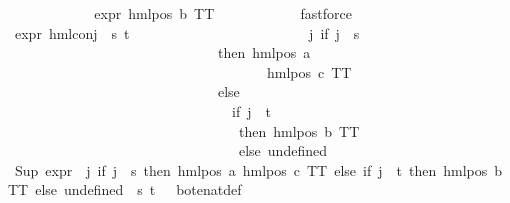 \begin{isabellebody}
\ \ \ \ \isamarkupfalse%
{\isacharminus}{\kern0pt}\isanewline
\ \ \ \ \ \ \isamarkupfalse%
\ {\isachardoublequoteopen}expr{\isacharunderscore}{\kern0pt}{}\ {\isacharparenleft}{\kern0pt}hml{\isacharunderscore}{\kern0pt}pos\ b\ TT{\isacharparenright}{\kern0pt}\ {\isacharequal}{\kern0pt}\ {}{\isachardoublequoteclose}\isanewline
\ \ \ \ \ \ \ \ \isamarkupfalse%
\ fastforce\isanewline
\ \ \ \ \ \ \isamarkupfalse%
\ {\isachardoublequoteopen}expr{\isacharunderscore}{\kern0pt}{}\ {\isacharparenleft}{\kern0pt}hml{\isacharunderscore}{\kern0pt}conj\ {\isacharbraceleft}{\kern0pt}{\isacharbraceright}{\kern0pt}\ {\isacharbraceleft}{\kern0pt}s{\isacharcomma}{\kern0pt}\ t{\isacharbraceright}{\kern0pt}\ \isanewline
\ \ \ \ \ \ \ \ \ \ \ \ \ \ \ \ \ \ \ \ \ \ \ \ {\isacharparenleft}{\kern0pt}{\isasymlambda}j{\isachardot}{\kern0pt}\ {\isacharparenleft}{\kern0pt}if\ j\ {\isacharequal}{\kern0pt}\ s\ \isanewline
\ \ \ \ \ \ \ \ \ \ \ \ \ \ \ \ \ \ \ \ \ \ \ \ \ \ \ \ \ \ then\ {\isacharparenleft}{\kern0pt}hml{\isacharunderscore}{\kern0pt}pos\ a\ \isanewline
\ \ \ \ \ \ \ \ \ \ \ \ \ \ \ \ \ \ \ \ \ \ \ \ \ \ \ \ \ \ \ \ \ \ \ \ \ {\isacharparenleft}{\kern0pt}hml{\isacharunderscore}{\kern0pt}pos\ c\ TT{\isacharparenright}{\kern0pt}{\isacharparenright}{\kern0pt}\ \isanewline
\ \ \ \ \ \ \ \ \ \ \ \ \ \ \ \ \ \ \ \ \ \ \ \ \ \ \ \ \ \ else\ \isanewline
\ \ \ \ \ \ \ \ \ \ \ \ \ \ \ \ \ \ \ \ \ \ \ \ \ \ \ \ \ \ \ \ {\isacharparenleft}{\kern0pt}if\ j\ {\isacharequal}{\kern0pt}\ t\ \isanewline
\ \ \ \ \ \ \ \ \ \ \ \ \ \ \ \ \ \ \ \ \ \ \ \ \ \ \ \ \ \ \ \ \ then\ {\isacharparenleft}{\kern0pt}hml{\isacharunderscore}{\kern0pt}pos\ b\ TT{\isacharparenright}{\kern0pt}\ \isanewline
\ \ \ \ \ \ \ \ \ \ \ \ \ \ \ \ \ \ \ \ \ \ \ \ \ \ \ \ \ \ \ \ \ else\ undefined{\isacharparenright}{\kern0pt}{\isacharparenright}{\kern0pt}{\isacharparenright}{\kern0pt}{\isacharparenright}{\kern0pt}\ {\isacharequal}{\kern0pt}\ {}{\isachardoublequoteclose}\isanewline
\ \ \ \ \ \ \ \ \isamarkupfalse%
\ {\isacartoucheopen}Sup\ {\isacharparenleft}{\kern0pt}{\isacharparenleft}{\kern0pt}expr{\isacharunderscore}{\kern0pt}{}\ {\isasymcirc}\ {\isacharparenleft}{\kern0pt}{\isasymlambda}j{\isachardot}{\kern0pt}\ if\ j\ {\isacharequal}{\kern0pt}\ s\ then\ hml{\isacharunderscore}{\kern0pt}pos\ a\ {\isacharparenleft}{\kern0pt}hml{\isacharunderscore}{\kern0pt}pos\ c\ TT{\isacharparenright}{\kern0pt}\ else\ if\ j\ {\isacharequal}{\kern0pt}\ t\ then\ hml{\isacharunderscore}{\kern0pt}pos\ b\ TT\ else\ undefined{\isacharparenright}{\kern0pt}{\isacharparenright}{\kern0pt}\ {\isacharbackquote}{\kern0pt}\ {\isacharbraceleft}{\kern0pt}s{\isacharcomma}{\kern0pt}\ t{\isacharbraceright}{\kern0pt}{\isacharparenright}{\kern0pt}\ {\isacharequal}{\kern0pt}\ {}{\isacartoucheclose}\ bot{\isacharunderscore}{\kern0pt}enat{\isacharunderscore}{\kern0pt}def\ \isamarkupfalse%

\end{isabellebody}

